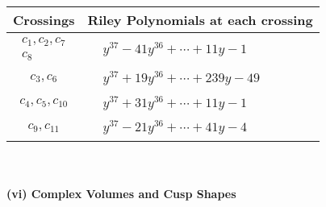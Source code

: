 \documentclass[1p]{elsarticle_modified}
\theoremstyle{definition}
\begin{document}
\begin{tabular}{m{50pt}|m{274pt}}
Crossings & \hspace{64pt}Riley Polynomials at each crossing \\
\hline $$\begin{aligned}c_{1},c_{2},c_{7}\\c_{8}\end{aligned}$$&$\begin{aligned}
&y^{37}-41 y^{36}+\cdots+11 y-1
\end{aligned}$\\
\hline $$\begin{aligned}c_{3},c_{6}\end{aligned}$$&$\begin{aligned}
&y^{37}+19 y^{36}+\cdots+239 y-49
\end{aligned}$\\
\hline $$\begin{aligned}c_{4},c_{5},c_{10}\end{aligned}$$&$\begin{aligned}
&y^{37}+31 y^{36}+\cdots+11 y-1
\end{aligned}$\\
\hline $$\begin{aligned}c_{9},c_{11}\end{aligned}$$&$\begin{aligned}
&y^{37}-21 y^{36}+\cdots+41 y-4
\end{aligned}$\\
\hline
\end{tabular}\\~\\
\newpage\flushleft \textbf{(vi) Complex Volumes and Cusp Shapes}
\end{document}

